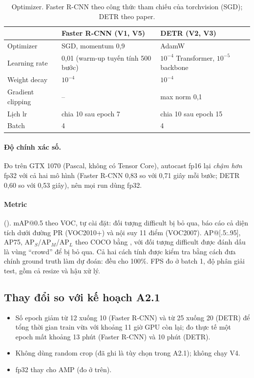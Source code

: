 \documentclass[11pt, a4paper]{article}
\begin{document}
\begin{table}[H]
  \centering
  \caption{Optimizer. Faster R-CNN theo công thức tham chiếu của torchvision (SGD); DETR theo paper.}
  \label{tab:optim}
  \small
  \begin{tabular}{lll}
    \toprule
    & \textbf{Faster R-CNN (V1, V5)} & \textbf{DETR (V2, V3)} \\
    \midrule
    Optimizer & SGD, momentum 0,9 & AdamW \\
    Learning rate & 0,01 (warm-up tuyến tính 500 bước) & $10^{-4}$ Transformer, $10^{-5}$ backbone \\
    Weight decay & $10^{-4}$ & $10^{-4}$ \\
    Gradient clipping & -- & max norm 0,1 \\
    Lịch lr & chia 10 sau epoch 7 & chia 10 sau epoch 15 \\
    Batch & 4 & 4 \\
    \bottomrule
  \end{tabular}
\end{table}

\paragraph{Độ chính xác số.} Đo trên GTX 1070 (Pascal, không có Tensor Core), autocast fp16 lại \emph{chậm hơn} fp32 với cả hai mô hình (Faster R-CNN 0,83 so với 0,71 giây mỗi bước; DETR 0,60 so với 0,53 giây), nên mọi run dùng fp32.

\paragraph{Metric} (). mAP@0.5 theo VOC, tự cài đặt: đối tượng difficult bị bỏ qua, báo cáo cả diện tích dưới đường PR (VOC2010+) và nội suy 11 điểm (VOC2007). AP@[.5:.95], AP75, AP$_S$/AP$_M$/AP$_L$ theo COCO bằng , với đối tượng difficult được đánh dấu là vùng ``crowd'' để bị bỏ qua. Cả hai cách tính được kiểm tra bằng cách đưa chính ground truth làm dự đoán: đều cho 100\%. FPS đo ở batch 1, độ phân giải test, gồm cả resize và hậu xử lý.

\subsection{Thay đổi so với kế hoạch A2.1}
\begin{itemize}
  \item Số epoch giảm từ 12 xuống 10 (Faster R-CNN) và từ 25 xuống 20 (DETR) để tổng thời gian train vừa với khoảng 11 giờ GPU còn lại; đo thực tế một epoch mất khoảng 13 phút (Faster R-CNN) và 10 phút (DETR).
  \item Không dùng random crop (đã ghi là tùy chọn trong A2.1); không chạy V4.
  \item fp32 thay cho AMP (đo ở trên).
\end{itemize}
\end{document}
